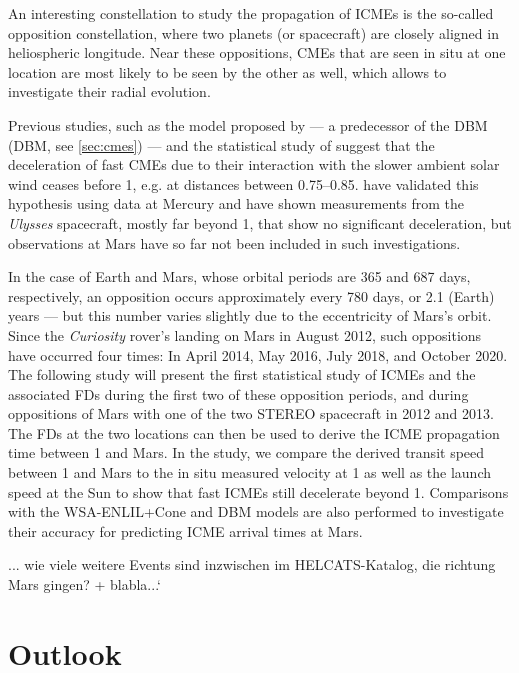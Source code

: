 An interesting constellation to study the propagation of \acp{ICME} is the so-called opposition constellation, where two planets (or spacecraft) are closely aligned in heliospheric longitude. Near these oppositions, CMEs that are seen in situ at one location are most likely to be seen by the other as well, which allows to investigate their radial evolution.

Previous studies, such as the model proposed by \citet{Gopalswamy-2001} --- a predecessor of the \acl{DBM} (\acs{DBM}, see \autoref{sec:cmes}) --- and the statistical study of \citet{Winslow-2015} suggest that the deceleration of fast \acp{CME} due to their interaction with the slower ambient solar wind ceases before \SI{1}{\AU}, e.g. at distances between \SIrange[range-phrase={\,and\,}]{0.75}{0.85}{\AU}. \citet{Winslow-2015} have validated this hypothesis using data at Mercury and \citet{Wang-2005} have shown measurements from the \textit{Ulysses} spacecraft, mostly far beyond \SI{1}{\AU}, that show no significant deceleration, but observations at Mars have so far not been included in such investigations.

In the case of Earth and Mars, whose orbital periods are 365 and 687 days, respectively, an opposition occurs approximately every 780 days, or 2.1 (Earth) years --- but this number varies slightly due to the eccentricity of Mars's orbit. Since the \textit{Curiosity} rover's landing on Mars in August 2012, such oppositions have occurred four times: In April 2014, May 2016, July 2018, and October 2020. The following study will present the first statistical study of \acp{ICME} and the associated \acp{FD} during the first two of these opposition periods, and during oppositions of Mars with one of the two \ac{STEREO} spacecraft in 2012 and 2013. The \acp{FD} at the two locations can then be used to derive the \ac{ICME} propagation time between \SI{1}{\AU} and Mars. In the study, we compare the derived transit speed between \SI{1}{\AU} and Mars to the in situ measured velocity at \SI{1}{\AU} as well as the launch speed at the Sun to show that fast \acp{ICME} still decelerate beyond \SI{1}{\AU}. Comparisons with the WSA-ENLIL+Cone and \ac{DBM} models are also performed to investigate their accuracy for predicting \ac{ICME} arrival times at Mars.



... wie viele weitere Events sind inzwischen im HELCATS-Katalog, die richtung Mars gingen? + blabla...`




\section{Outlook}